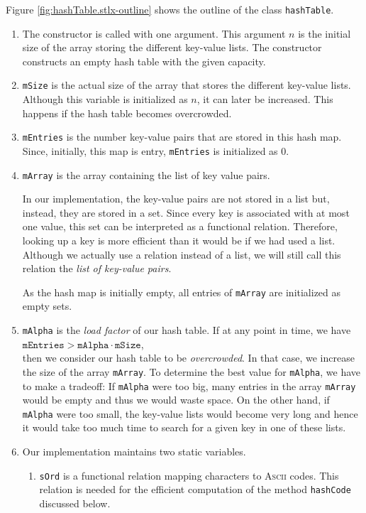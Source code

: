 Figure \ref{fig:hashTable.stlx-outline} shows the outline of the class \texttt{hashTable}.  
\begin{enumerate}
\item The constructor is called with one argument.  This argument $n$ is the initial size
      of the array storing the different key-value lists.  The constructor constructs an empty hash
      table with the given capacity.
\item \texttt{mSize} is the actual size of the array that stores the different key-value lists.
      Although this variable is initialized as $n$, it can later be increased.  This happens
      if the hash table becomes overcrowded.
\item \texttt{mEntries} is the number key-value pairs that are stored in this hash map.
      Since, initially, this map is entry, \texttt{mEntries} is  initialized as $0$.
\item \texttt{mArray} is the array containing the list of key value pairs.

      In our implementation, the key-value pairs are not stored in a list but, instead, they are
      stored in a set.  Since every key is associated with at most one value, this set can be interpreted as a
      functional relation.  Therefore, looking up a key is more efficient than it would be if we had
      used a list.  Although we actually use a relation instead of a list, we will still call
      this relation the \emph{list of key-value pairs}.

      As the hash map is initially empty, all entries of \texttt{mArray} are initialized as empty sets.
\item \texttt{mAlpha} is the \emph{load factor} of our hash table.  If at any point in time, we have
      \\[0.2cm]
      \hspace*{1.3cm}
      $\texttt{mEntries} > \texttt{mAlpha} \cdot \texttt{mSize}$,
      \\[0.2cm]
      then we consider our hash table to be \emph{overcrowded}.  In that case, we increase the size
      of the array \texttt{mArray}.  To determine the best value for \texttt{mAlpha}, we have to
      make a tradeoff:  If \texttt{mAlpha} were too big, many entries in the array \texttt{mArray}
      would be empty and thus we would waste space.  On the other hand, if \texttt{mAlpha} were too
      small, the key-value lists would become very long and hence it would take too much time to
      search for a given key in one of these lists.
\item Our implementation maintains two static variables.
  \begin{enumerate}
  \item \texttt{sOrd} is a functional relation mapping characters to \textsc{Ascii} codes.
        This relation is needed for the efficient computation of the method \texttt{hashCode}
        discussed below.


\end{enumerate}
\end{enumerate}
